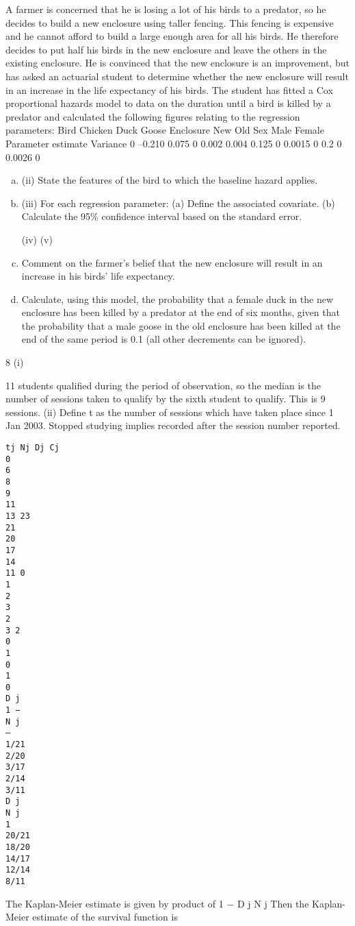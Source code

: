 \documentclass[a4paper,12pt]{article}
\begin{document}
A farmer is concerned that he is losing a lot of his birds to a predator, so he decides to build a new enclosure using taller fencing. This fencing is expensive and he cannot afford to build a large enough area for all his birds. He therefore decides to put half
his birds in the new enclosure and leave the others in the existing enclosure. He is convinced that the new enclosure is an improvement, but has asked an actuarial student to determine whether the new enclosure will result in an increase in the life
expectancy of his birds. The student has fitted a Cox proportional hazards model to
data on the duration until a bird is killed by a predator and calculated the following
figures relating to the regression parameters:
Bird Chicken
Duck
Goose
Enclosure New
Old
Sex Male
Female
Parameter estimate Variance
0
–0.210
0.075 0
0.002
0.004
0.125
0 0.0015
0
0.2
0 0.0026
0
\begin{enumerate}[(a)]
\item (ii) State the features of the bird to which the baseline hazard applies.
\item (iii) For each regression parameter:
(a) Define the associated covariate.
(b) Calculate the 95\% confidence interval based on the standard error.
 
 
(iv)
(v)
\item Comment on the farmer’s belief that the new enclosure will result in an increase in his birds’ life expectancy.
\item  
Calculate, using this model, the probability that a female duck in the new enclosure has been killed by a predator at the end of six months, given that the probability that a male goose in the old enclosure has been killed at the end of the same period is 0.1 (all other decrements can be ignored).
\end{enumerate}



8
(i)

11 students qualified during the period of observation, so the median is the number of sessions taken to qualify by the sixth student to qualify.
This is 9 sessions.
(ii)
Define t as the number of sessions which have taken place since 1 Jan 2003.
Stopped studying implies recorded after the session number reported.
\begin{verbatim}
tj Nj Dj Cj
0
6
8
9
11
13 23
21
20
17
14
11 0
1
2
3
2
3 2
0
1
0
1
0
D j
1 −
N j
–
1/21
2/20
3/17
2/14
3/11
D j
N j
1
20/21
18/20
14/17
12/14
8/11
\end{verbatim}
The Kaplan-Meier estimate is given by product of 1 −
D j
N j
Then the Kaplan-Meier estimate of the survival function is
\end{document}
